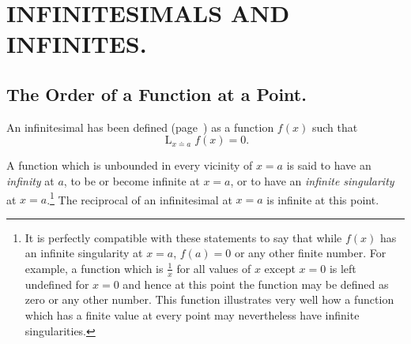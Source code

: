 \documentclass[a4paper,12pt]{book}[2004/02/16]
\providecommand{\hypertarget}[2]{#2}
\theoremstyle{ilemma}
\theoremstyle{itheorem}
\theoremstyle{iother}
\theoremstyle{icorollary}
\theoremstyle{numcorollary}
\theoremstyle{idefinition}
\renewcommand{\dfrac}[2]{\frac{#1}{#2}}%
\begin{document}
\chapter{INFINITESIMALS AND INFINITES.}\hypertarget{chapVI}{}%

\section{The Order of a Function at a Point.}\hypertarget{chVIsec1}{}%

An infinitesimal has been defined (page~\pageref{dp75}) as a function
$f(x)$ such that
\[
  \mathop{L}_{x \doteq a} f(x)=0.
\]

A function which is unbounded in every vicinity of $x=a$ is said to
have an \textit{infinity} at $a$, to be or become infinite at $x=a$,
or to have an \textit{infinite singularity} at $x=a$.\footnote{%
  It is perfectly compatible with these statements to say that while
  $f(x)$ has an infinite singularity at $x=a$, $f(a)=0$ or any other
  finite number.  For example, a function which is $\dfrac{1}{x}$ for
  all values of $x$ except $x=0$ is left undefined for $x=0$ and hence
  at this point the function may be defined as zero or any other
  number. This function illustrates very well how a function which has
  a finite value at every point may nevertheless have infinite
  singularities.}
The reciprocal of an infinitesimal at $x=a$ is infinite at this point.
\end{document}
